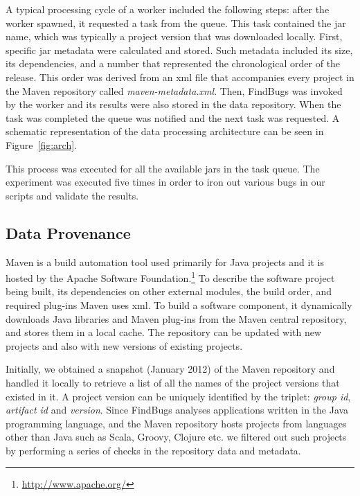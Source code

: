\documentclass[conference]{llncs}
\begin{document}
A typical processing cycle of a worker included the following steps: after
the worker spawned, it requested a task from the queue. This task contained
the {\sc jar} name, which was typically a project version that was downloaded locally.
First, specific {\sc jar} metadata were calculated and stored. Such metadata included
its size, its dependencies, and a number that represented the chronological order of the
release. This order was derived from an {\sc xml} file that
accompanies every project in the Maven repository called {\it
maven-metadata.xml}. Then, FindBugs was invoked by the worker and its results were
also stored in the data repository. When the task was completed the queue
was notified and the next task was requested. A schematic representation
of the data processing architecture can be seen in Figure~\ref{fig:arch}.

This process was executed for all the available {\sc jar}s in the task queue.
The experiment was executed five times in order to iron out various bugs in
our scripts and validate the results. 

\subsection{Data Provenance}
\label{sec:data}

Maven is a build automation tool used primarily for Java projects and it is
hosted by the Apache Software Foundation.\footnote{\url{http://www.apache.org/}}
To describe the software project being built, its dependencies
on other external modules, the build order, and required plug-ins Maven uses
{\sc xml}. To build a software component, it dynamically downloads Java libraries
and Maven plug-ins from the Maven central repository,
and stores them in a local cache. The repository can be updated with
new projects and also with new versions of existing projects.

Initially, we obtained a snapshot (January 2012) of the Maven repository and
handled it locally to retrieve a list of all the names of the project versions
that existed in it. A project version can be uniquely identified by the triplet:
{\it group id}, {\it artifact id} and {\it version}.
Since FindBugs analyses applications written in the Java
programming language, and the Maven repository
hosts projects from languages other than Java such as Scala, Groovy,
Clojure etc. we filtered out such projects by performing a series of checks in
the repository data and metadata.
\end{document}
